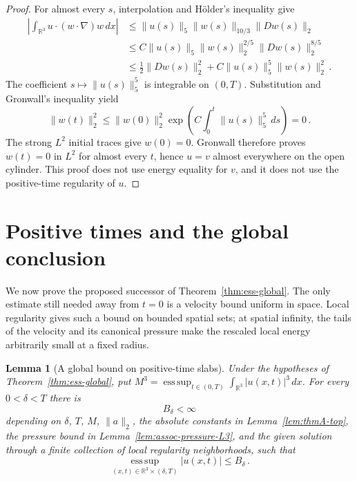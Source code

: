 \documentclass[11pt,letterpaper]{article}
\numberwithin{equation}{section}
\theoremstyle{plain}
\newtheorem{lemma}[theorem]{Lemma}
\theoremstyle{definition}
\theoremstyle{remark}
\begin{document}
\begin{proof}
For almost every $s$, interpolation and H\"older's inequality give
\begin{align*}
\left|\int_{\mathbb R^3}u\cdot(w\cdot\nabla)w\,dx\right|
 &\le\|u(s)\|_5\|w(s)\|_{10/3}\|Dw(s)\|_2\\
 &\le C\|u(s)\|_5\|w(s)\|_2^{2/5}\|Dw(s)\|_2^{8/5}\\
 &\le\frac12\|Dw(s)\|_2^2+C\|u(s)\|_5^5\|w(s)\|_2^2\,.
\end{align*}
The coefficient $s\mapsto\|u(s)\|_5^5$ is integrable on $(0,T)$. Substitution and Gronwall's inequality yield
\begin{equation*}
\|w(t)\|_2^2\le \|w(0)\|_2^2\exp\!\left(C\int_0^t\|u(s)\|_5^5\,ds\right)=0\,.
\end{equation*}
The strong $L^2$ initial traces give $w(0)=0$. Gronwall therefore proves $w(t)=0$ in $L^2$ for almost every $t$, hence $u=v$ almost everywhere on the open cylinder. This proof does not use energy equality for $v$, and it does not use the positive-time regularity of $u$.
\end{proof}

\section{Positive times and the global conclusion}\label{sec:pv-assembly}

We now prove the proposed successor of Theorem~\ref{thm:ess-global}. The only estimate still needed away from $t=0$ is a velocity bound uniform in space. Local regularity gives such a bound on bounded spatial sets; at spatial infinity, the tails of the velocity and its canonical pressure make the rescaled local energy arbitrarily small at a fixed radius.

\begin{lemma}[A global bound on positive-time slabs]\label{lem:pv-positive-bound}
Under the hypotheses of Theorem~\ref{thm:ess-global}, put $M^3=\operatorname*{ess\,sup}_{t\in(0,T)}\int_{\mathbb R^3}|u(x,t)|^3\,dx$. For every $0<\delta<T$ there is
\begin{equation*}
B_\delta<\infty
\end{equation*}
depending on $\delta$, $T$, $M$, $\|a\|_2$, the absolute constants in Lemma~\ref{lem:thmA-top}, the pressure bound in Lemma~\ref{lem:assoc-pressure-L3}, and the given solution through a finite collection of local regularity neighborhoods, such that
\begin{equation*}
\operatorname*{ess\,sup}_{(x,t)\in\mathbb R^3\times(\delta,T)}|u(x,t)|\le B_\delta\,.
\end{equation*}
\end{lemma}
\end{document}
